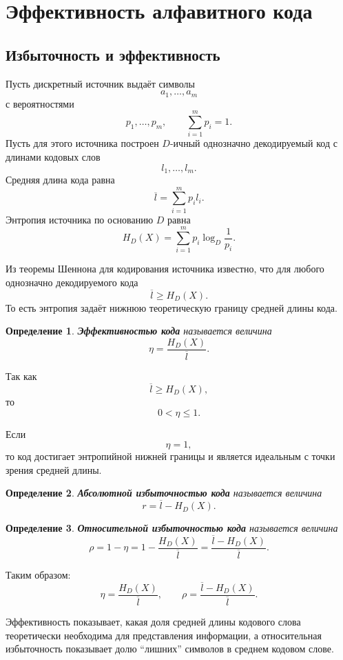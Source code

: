 \documentclass[12pt,a4paper]{article}
\newtheorem{definition}{Определение}[section]
\begin{document}
\section{Эффективность алфавитного кода}

\subsection{Избыточность и эффективность}

Пусть дискретный источник выдаёт символы
\[
    a_1,\dots,a_m
\]
с вероятностями
\[
    p_1,\dots,p_m,
    \qquad
    \sum_{i=1}^{m}p_i=1.
\]
Пусть для этого источника построен $D$-ичный однозначно декодируемый код с длинами кодовых слов
\[
    l_1,\dots,l_m.
\]
Средняя длина кода равна
\[
    \overline l = \sum_{i=1}^{m}p_i l_i.
\]
Энтропия источника по основанию $D$ равна
\[
    H_D(X)=\sum_{i=1}^{m}p_i\log_D\frac1{p_i}.
\]

Из теоремы Шеннона для кодирования источника известно, что для любого однозначно декодируемого кода
\[
    \overline l\ge H_D(X).
\]
То есть энтропия задаёт нижнюю теоретическую границу средней длины кода.

\begin{definition}
\textbf{Эффективностью кода} называется величина
\[
    \eta = \frac{H_D(X)}{\overline l}.
\]
\end{definition}

Так как
\[
    \overline l\ge H_D(X),
\]
то
\[
    0<\eta\le 1.
\]

Если
\[
    \eta=1,
\]
то код достигает энтропийной нижней границы и является идеальным с точки зрения средней длины.

\begin{definition}
\textbf{Абсолютной избыточностью кода} называется величина
\[
    r = \overline l - H_D(X).
\]
\end{definition}

\begin{definition}
\textbf{Относительной избыточностью кода} называется величина
\[
    \rho = 1-\eta
    =
    1-\frac{H_D(X)}{\overline l}
    =
    \frac{\overline l-H_D(X)}{\overline l}.
\]
\end{definition}

Таким образом:
\[
    \eta=\frac{H_D(X)}{\overline l},
    \qquad
    \rho=\frac{\overline l-H_D(X)}{\overline l}.
\]

Эффективность показывает, какая доля средней длины кодового слова теоретически необходима для представления информации, а относительная избыточность показывает долю ``лишних'' символов в среднем кодовом слове.
\end{document}
